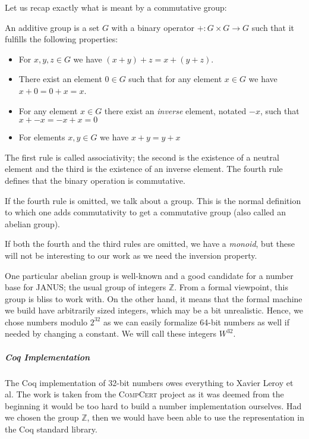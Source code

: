 Let us recap exactly what is meant by a commutative group:
\begin{defn}
  An additive group is a set $G$ with a binary operator $+\colon G
  \times G \to G$ such that it fulfills the following properties:
  \begin{itemize}
  \item For $x,y,z \in G$ we have $(x + y) + z = x + (y + z)$.
  \item There exist an element $0 \in G$ such that for any element $x
    \in G$ we have $x + 0 = 0 + x = x$.
  \item For any element $x \in G$ there exist an \emph{inverse}
    element, notated $-x$, such that $x + -x = -x + x = 0$
  \item For elements $x, y \in G$ we have $x + y = y + x$
  \end{itemize}
  The first rule is called associativity; the second is the existence
  of a neutral element and the third is the existence of an inverse
  element. The fourth rule defines that the binary operation is
  commutative.

  If the fourth rule is omitted, we talk about a group. This is the
  normal definition to which one adds commutativity to get a
  commutative group (also called an abelian group).

  If both the fourth and the third rules are omitted, we have a
  \emph{monoid}, but these will not be interesting to our work as we
  need the inversion property.
\end{defn}

One particular abelian group is well-known and a good candidate for a
number base for JANUS; the usual group of integers $\mathbb{Z}$. From
a formal viewpoint, this group is bliss to work with. On the other
hand, it means that the formal machine we build have arbitrarily sized
integers, which may be a bit unrealistic. Hence, we chose numbers
modulo $2^{32}$ as we can easily formalize 64-bit numbers as well if
needed by changing a constant. We will call these integers $W^{32}$.

\subparagraph{Coq Implementation}

The Coq implementation of 32-bit numbers owes everything to Xavier
Leroy et al. The work is taken from the \textsc{CompCert} project as
it was deemed from the beginning it would be too hard to build a
number implementation ourselves. Had we chosen the group $\mathbb{Z}$,
then we would have been able to use the representation in the Coq
standard library.

